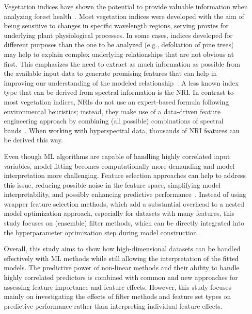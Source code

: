\documentclass[remotesensing,article,accept,moreauthors,pdftex]{Definitions/mdpi}
\begin{document}
Vegetation indices have shown the potential to provide valuable information when analyzing forest health~\cite{jiang2014, adamczyk2015}.
Most vegetation indices were developed with the aim of being sensitive to changes in specific wavelength regions, serving proxies for underlying plant physiological processes.
In some cases, indices developed for different purposes than the one to be analyzed (e.g., defoliation of pine trees) may help to explain complex underlying relationships that are not obvious at first.
This emphasizes the need to extract as much information as possible from the available input data to generate promising features that can help in improving our understanding of the modeled relationship~\cite{thenkabail2018}.
A less known index type that can be derived from spectral information is the \ac{NRI}.
In contrast to most vegetation indices, \ac{NRI}s do not use an expert-based formula following environmental heuristics; instead, they make use of a data-driven feature engineering approach by combining (all possible) combinations of spectral bands~\cite{thenkabail2000}.
When working with hyperspectral data, thousands of \ac{NRI} features can be derived this way.

Even though \ac{ML} algorithms are capable of handling highly correlated input variables, model fitting becomes computationally more demanding and model interpretation more challenging.
Feature selection approaches can help to address this issue, reducing possible noise in the feature space, simplifying model interpretability, and possibly enhancing predictive performance~\cite{cai2018}.
Instead of using wrapper feature selection methods, which add a substantial overhead to a nested model optimization approach, especially for datasets with many features, this study focuses on (ensemble) filter methods, which can be directly integrated into the hyperparameter optimization step during model construction.

Overall, this study aims to show how high-dimensional datasets can be handled effectively with ML methods while still allowing the interpretation of the fitted models.
The predictive power of non-linear methods and their ability to handle highly correlated predictors is combined with common and new approaches for assessing feature importance and feature effects.
However, this study focuses mainly on investigating the effects of filter methods and feature set types on predictive performance rather than interpreting individual feature effects.
\end{document}
